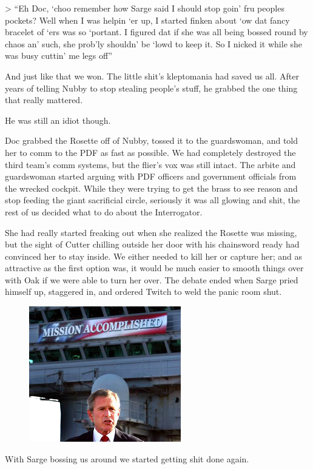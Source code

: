 > “Eh Doc, ‘choo remember how Sarge said I should stop goin’ fru peoples pockets? 
Well when I was helpin ‘er up, I started finken about ‘ow dat fancy bracelet of ‘ers was so ‘portant. 
I figured dat if she was all being bossed round by chaos an’ such, she prob’ly shouldn’ be ‘lowd to keep it. 
So I nicked it while she was busy cuttin’ me legs off”

And just like that we won. 
The little shit’s kleptomania had saved us all. 
After years of telling Nubby to stop stealing people’s stuff, he grabbed the one thing that really mattered.

He was still an idiot though.

Doc grabbed the Rosette off of Nubby, tossed it to the guardswoman, and told her to comm to the PDF as fast as possible. 
We had completely destroyed the third team’s comm systems, but the flier’s vox was still intact. 
The arbite and guardswoman started arguing with PDF officers and government officials from the wrecked cockpit. 
While they were trying to get the brass to see reason and stop feeding the giant sacrificial circle, seriously it was all glowing and shit, the rest of us decided what to do about the Interrogator.

She had really started freaking out when she realized the Rosette was missing, but the sight of Cutter chilling outside her door with his chainsword ready had convinced her to stay inside. 
We either needed to kill her or capture her; 
and as attractive as the first option was, it would be much easier to smooth things over with Oak if we were able to turn her over. 
The debate ended when Sarge pried himself up, staggered in, and ordered Twitch to weld the panic room shut.

\begin{figure}
	\begin{center}
		\includegraphics[width=\figwidth]{pics/5/39.png}
	\end{center}
\end{figure}
With Sarge bossing us around we started getting shit done again.


